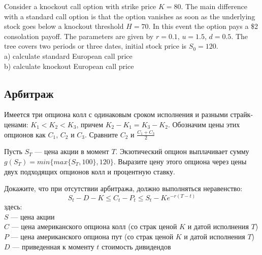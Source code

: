\begin{problem}
 Consider a knockout call option with strike price $K=80$. The main difference with a standard call option is that the option vanishes as soon as the underlying stock goes below a knockout threshold $H=70$. In this event the option pays a \$2 consolation payoff. The parameters are given by $r=0.1$, $u=1.5$, $d=0.5$. The tree covers two periods or three dates, initial stock price is $S_{0}=120$. \\
a) calculate standard European call price \\
b) calculate knockout European call price

\begin{sol}
\end{sol}
\end{problem}



\subsection{Арбитраж}

\begin{problem}
Имеется три опциона колл с одинаковым сроком исполнения и разными страйк-ценами: $K_{1}<K_{2}<K_{3}$, причем $K_{2}-K_{1}=K_{3}-K_{2}$. Обозначим цены этих опционов как $C_{1}$, $C_{2}$ и $C_{3}$. Сравните $C_{2}$ и $\frac{C_{1}+C_{3}}{2}$

\begin{sol}

\end{sol}
\end{problem}

\begin{problem}
 Пусть $S_{T}$ — цена акции в момент $T$. Экзотический опцион выплачивает сумму $g(S_{T})=min\{max\{S_{T},100\},120\}$. Выразите цену этого опциона через цены двух подходящих опционов колл и процентную ставку.

\begin{sol}

\end{sol}
\end{problem}

\begin{problem}
Докажите, что при отсутствии арбитража, должно выполняться неравенство:
\[
S_{t}-D-K\le C_{t}-P_{t}\le S_{t}-Ke^{-r(T-t)}
\]
здесь:\\
$S$ — цена акции \\
$C$ — цена американского опциона колл (со страк ценой $K$ и датой исполнения $T$)\\
$P$ — цена американского опциона пут (со страк ценой $K$ и датой исполнения $T$)\\
$D$ — приведенная к моменту $t$ стоимость дивидендов

\begin{sol}
\end{sol}
\end{problem}




